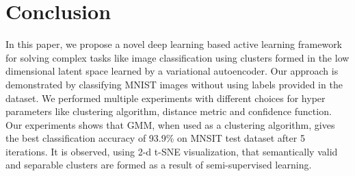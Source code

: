 \documentclass{bmvc2k}
\begin{document}
\section{Conclusion}
In this paper, we propose a novel deep learning based active learning framework for solving complex tasks like image classification using clusters formed in the low dimensional latent space learned by a variational autoencoder.
Our approach is demonstrated by classifying MNIST images without using labels provided in the dataset.
We performed multiple experiments with different choices for hyper parameters like clustering algorithm, distance metric and confidence function.
Our experiments shows that GMM, when used as a clustering algorithm,  gives the best classification accuracy of 93.9\% on MNSIT test dataset after 5 iterations.
It is observed, using 2-d t-SNE visualization, that  semantically valid and separable clusters are formed as a result of semi-supervised learning.






\end{document}
